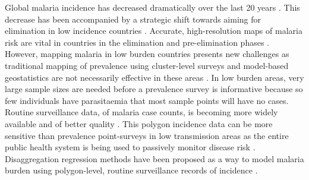 \documentclass{statsoc}
\begin{document}
Global malaria incidence has decreased dramatically over the last 20 years \citep{abajobir2017global, bhatt2015effect}.
This decrease has been accompanied by a strategic shift towards aiming for elimination in low incidence countries \citep{world2016world, newby2016path}.
Accurate, high-resolution maps of malaria risk are vital in countries in the elimination and pre-elimination phases \citep{sturrock2016mapping, cohen2017mapping}.
However, mapping malaria in low burden countries presents new challenges as traditional mapping of prevalence \citep{gething2011new, bhatt2017improved, gething2012long, bhatt2015effect} using cluster-level surveys and model-based geostatistics are not necessarily effective in these areas \citep{sturrock2016mapping, sturrock2014fine}.
In low burden areas, very large sample sizes are needed before a prevalence survey is informative because so few individuals have parasitaemia that most sample points will have no cases.
Routine surveillance data, of malaria case counts, is becoming more widely available and of better quality \citep{sturrock2016mapping, ohrt2015information, cibulskis2011worldwide}.
This polygon incidence data can be more sensitive than prevalence point-surveys in low transmission areas as the entire public health system is being used to passively monitor disease risk \citep{cibulskis2011worldwide}.
Disaggregation regression methods have been proposed as a way to model malaria burden using polygon-level, routine surveillance records of incidence \citep{sturrock2014fine, wilson2017pointless, law2018variational, taylor2017continuous, li2012log}.



\end{document}
